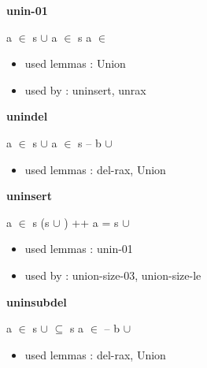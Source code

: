 \documentclass[a4paper]{article}
\begin{document}
\medskip

\bigskip

{\large\bf unin-01}

\medskip

 \Fol \Not a $\in$ s $\cup$  \Equiv \Not a $\in$ s \And \Not a $\in$ 

\begin{itemize}


\item       used lemmas  : Union
\item       used by      : uninsert, unrax

\end{itemize}

\medskip

\bigskip

{\large\bf unindel}

\medskip

 \Fol \Not a $\in$ s $\cup$  \Imp \Not a $\in$ s -- b $\cup$ 

\begin{itemize}


\item       used lemmas  : del-rax, Union

\end{itemize}

\medskip

\bigskip

{\large\bf uninsert}

\medskip

 \Fol a $\in$ s \Imp (s $\cup$ ) ++ a = s $\cup$ 

\begin{itemize}


\item       used lemmas  : unin-01
\item       used by      : union-size-03, union-size-le

\end{itemize}

\medskip

\bigskip

{\large\bf uninsubdel}

\medskip

 \Fol \Not a $\in$ s $\cup$  \And {} $\subseteq$ s \Imp \Not a $\in$  -- b $\cup$ 

\begin{itemize}


\item       used lemmas  : del-rax, Union

\end{itemize}
\end{document}
